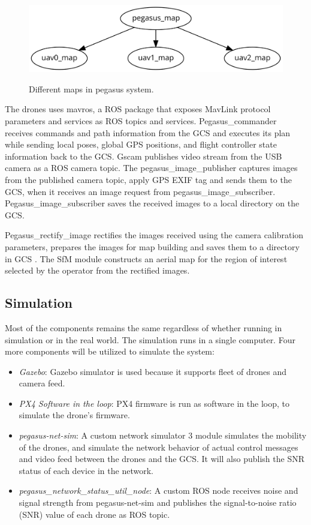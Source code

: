 \begin{figure}
	\centering
	\caption[Different maps in pegasus system.]{\small Different maps in pegasus system.}
	\includegraphics[width=5in]{figures/methodology/map-transformation-heirarichy}
	\label{fig:map-heirarichy}
\end{figure}


The drones uses mavros, a ROS package that exposes MavLink protocol parameters and services as ROS topics and services. Pegasus\_commander receives commands and path information from the GCS and executes its plan while sending local poses, global GPS positions, and flight controller state information back to the GCS. Gscam publishes video stream from the USB camera as a ROS camera topic. The pegasus\_image\_publisher captures images from the published camera topic, apply GPS EXIF tag and sends them to the GCS,  when it receives an image request from pegasus\_image\_subscriber. Pegasus\_image\_subscriber saves the received images to a local directory on the GCS. 

Pegasus\_rectify\_image rectifies the images received using the camera calibration parameters, prepares the images for map building and saves them to a directory in GCS . The SfM module constructs an aerial map for the region of interest selected by the operator from the rectified images.

\subsection{Simulation}

Most of the components remains the same regardless of whether running in simulation or in the real world. The simulation runs in a single computer. Four more components will be utilized to simulate the system:
\begin{itemize}
	\item \textit{Gazebo}: Gazebo simulator is used because it supports fleet of drones and camera feed.
	\item \textit{PX4 Software in the loop}: PX4 firmware is run as software in the loop, to simulate the drone's firmware. 
	\item \textit{pegasus-net-sim}: A custom network simulator 3 module simulates the mobility of the drones, and simulate the network behavior of actual control messages and video feed between the drones and the GCS. It will also publish the SNR status of each device in the network.
	\item \textit{pegasus\_network\_status\_util\_node}: A custom ROS node receives noise and signal strength from pegasus-net-sim and publishes the signal-to-noise ratio (SNR) value of each drone as ROS topic.
\end{itemize}


